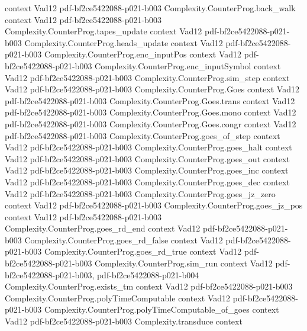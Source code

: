\begin{theorem}
  {context}
  {Vad12}
  {pdf-bf2ce5422088-p021-b003}
\proofstep
  {Complexity.CounterProg.back_walk}
  {context}
  {Vad12}
  {pdf-bf2ce5422088-p021-b003}
\proofstep
  {Complexity.CounterProg.tapes_update}
  {context}
  {Vad12}
  {pdf-bf2ce5422088-p021-b003}
\proofstep
  {Complexity.CounterProg.heads_update}
  {context}
  {Vad12}
  {pdf-bf2ce5422088-p021-b003}
\proofstep
  {Complexity.CounterProg.enc_inputPos}
  {context}
  {Vad12}
  {pdf-bf2ce5422088-p021-b003}
\proofstep
  {Complexity.CounterProg.enc_inputSymbol}
  {context}
  {Vad12}
  {pdf-bf2ce5422088-p021-b003}
\proofstep
  {Complexity.CounterProg.sim_step}
  {context}
  {Vad12}
  {pdf-bf2ce5422088-p021-b003}
\proofstep
  {Complexity.CounterProg.Goes}
  {context}
  {Vad12}
  {pdf-bf2ce5422088-p021-b003}
\proofstep
  {Complexity.CounterProg.Goes.trans}
  {context}
  {Vad12}
  {pdf-bf2ce5422088-p021-b003}
\proofstep
  {Complexity.CounterProg.Goes.mono}
  {context}
  {Vad12}
  {pdf-bf2ce5422088-p021-b003}
\proofstep
  {Complexity.CounterProg.Goes.congr}
  {context}
  {Vad12}
  {pdf-bf2ce5422088-p021-b003}
\proofstep
  {Complexity.CounterProg.goes_of_step}
  {context}
  {Vad12}
  {pdf-bf2ce5422088-p021-b003}
\proofstep
  {Complexity.CounterProg.goes_halt}
  {context}
  {Vad12}
  {pdf-bf2ce5422088-p021-b003}
\proofstep
  {Complexity.CounterProg.goes_out}
  {context}
  {Vad12}
  {pdf-bf2ce5422088-p021-b003}
\proofstep
  {Complexity.CounterProg.goes_inc}
  {context}
  {Vad12}
  {pdf-bf2ce5422088-p021-b003}
\proofstep
  {Complexity.CounterProg.goes_dec}
  {context}
  {Vad12}
  {pdf-bf2ce5422088-p021-b003}
\proofstep
  {Complexity.CounterProg.goes_jz_zero}
  {context}
  {Vad12}
  {pdf-bf2ce5422088-p021-b003}
\proofstep
  {Complexity.CounterProg.goes_jz_pos}
  {context}
  {Vad12}
  {pdf-bf2ce5422088-p021-b003}
\proofstep
  {Complexity.CounterProg.goes_rd_end}
  {context}
  {Vad12}
  {pdf-bf2ce5422088-p021-b003}
\proofstep
  {Complexity.CounterProg.goes_rd_false}
  {context}
  {Vad12}
  {pdf-bf2ce5422088-p021-b003}
\proofstep
  {Complexity.CounterProg.goes_rd_true}
  {context}
  {Vad12}
  {pdf-bf2ce5422088-p021-b003}
\proofstep
  {Complexity.CounterProg.sim_run}
  {context}
  {Vad12}
  {pdf-bf2ce5422088-p021-b003,
    pdf-bf2ce5422088-p021-b004}
\proofstep
  {Complexity.CounterProg.exists_tm}
  {context}
  {Vad12}
  {pdf-bf2ce5422088-p021-b003}
\proofstep
  {Complexity.CounterProg.polyTimeComputable}
  {context}
  {Vad12}
  {pdf-bf2ce5422088-p021-b003}
\proofstep
  {Complexity.CounterProg.polyTimeComputable_of_goes}
  {context}
  {Vad12}
  {pdf-bf2ce5422088-p021-b003}
\proofstep
  {Complexity.transduce}
  {context}

\end{theorem}
